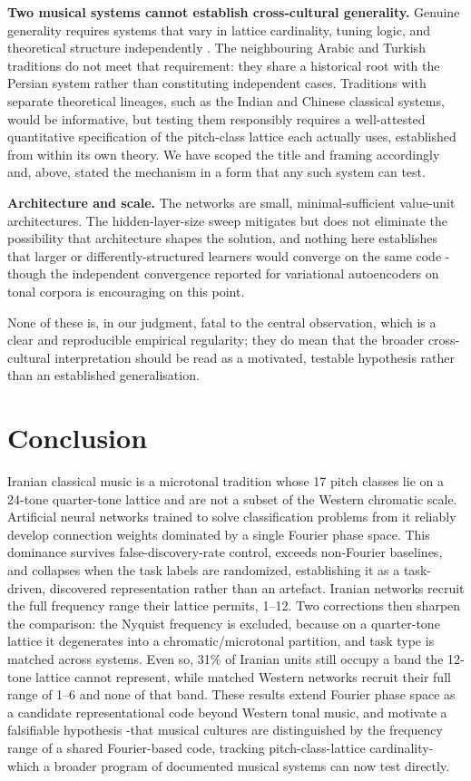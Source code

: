 \documentclass[pdflatex,sn-nature]{sn-jnl}
\newcommand{\num}[1]{#1}
\begin{document}
\textbf{Two musical systems cannot establish cross-cultural generality.} Genuine generality
requires systems that vary in lattice cardinality, tuning logic, and theoretical structure
independently \cite{jacoby2020}. The neighbouring Arabic and Turkish traditions do not
meet that requirement: they share a historical root with the Persian system rather than
constituting independent cases. Traditions with separate theoretical lineages, such as the
Indian and Chinese classical systems, would be informative, but testing them responsibly
requires a well-attested quantitative specification of the pitch-class lattice each actually
uses, established from within its own theory. We have scoped the title and framing
accordingly and, above, stated the mechanism in a form that any such system can test.

\textbf{Architecture and scale.} The networks are small, minimal-sufficient value-unit
architectures. The hidden-layer-size sweep mitigates but does not eliminate the possibility
that architecture shapes the solution, and nothing here establishes that larger or
differently-structured learners would converge on the same code -though the independent
convergence reported for variational autoencoders on tonal corpora \cite{rodrigues2024} is
encouraging on this point.

None of these is, in our judgment, fatal to the central observation, which is a clear and
reproducible empirical regularity; they do mean that the broader cross-cultural
interpretation should be read as a motivated, testable hypothesis rather than an established
generalisation.

\section{Conclusion}
Iranian classical music is a microtonal tradition whose 17 pitch classes lie on a 24-tone
quarter-tone lattice and are not a subset of the Western chromatic scale. Artificial neural
networks trained to solve classification problems from it reliably develop connection
weights dominated by a single Fourier phase space. This dominance survives false-discovery-rate
control, exceeds non-Fourier baselines, and collapses when the task labels are randomized,
establishing it as a task-driven, discovered representation rather than an artefact.
Iranian networks recruit the full frequency range their lattice permits, 1--12. Two
corrections then sharpen the comparison: the Nyquist frequency is excluded, because on a
quarter-tone lattice it degenerates into a chromatic/microtonal partition, and task type is
matched across systems. Even so, \num{31}\% of Iranian units still occupy a band the
12-tone lattice cannot represent, while matched Western networks recruit their full range
of 1--6 and none of that band. These results
extend Fourier phase space as a candidate representational code beyond Western tonal music,
and motivate a falsifiable hypothesis -that musical cultures are distinguished by the
frequency range of a shared Fourier-based code, tracking pitch-class-lattice
cardinality- which a broader program of documented musical systems can now test directly.
\end{document}
